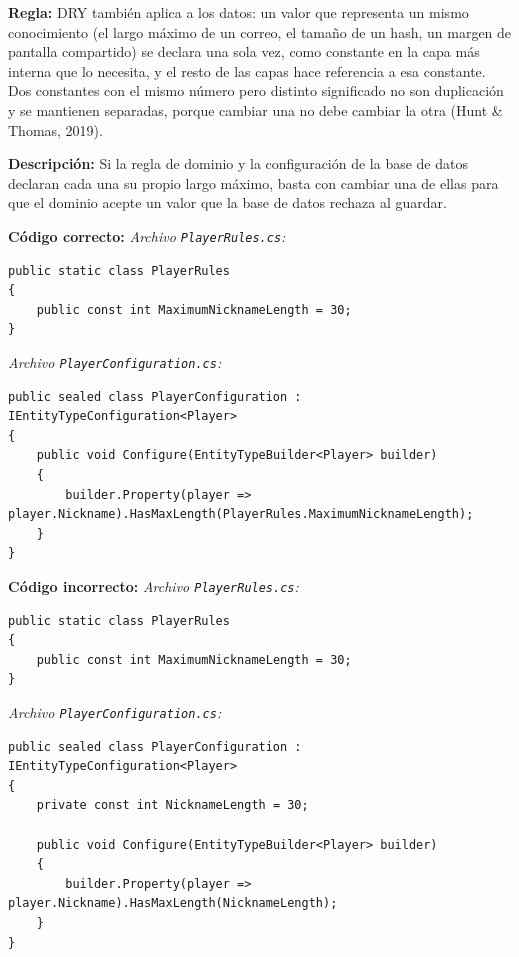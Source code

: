 \textbf{Regla:} DRY también aplica a los datos: un valor que representa un mismo conocimiento (el largo máximo de un correo, el tamaño de un hash, un margen de pantalla compartido) se declara una sola vez, como constante en la capa más interna que lo necesita, y el resto de las capas hace referencia a esa constante. Dos constantes con el mismo número pero distinto significado no son duplicación y se mantienen separadas, porque cambiar una no debe cambiar la otra (Hunt \& Thomas, 2019).

\textbf{Descripción:} Si la regla de dominio y la configuración de la base de datos declaran cada una su propio largo máximo, basta con cambiar una de ellas para que el dominio acepte un valor que la base de datos rechaza al guardar.

\textbf{Código correcto:}
\textit{Archivo \texttt{PlayerRules.cs}:}
\begin{lstlisting}[style=csharpstyle]
public static class PlayerRules
{
    public const int MaximumNicknameLength = 30;
}
\end{lstlisting}

\textit{Archivo \texttt{PlayerConfiguration.cs}:}
\begin{lstlisting}[style=csharpstyle]
public sealed class PlayerConfiguration : IEntityTypeConfiguration<Player>
{
    public void Configure(EntityTypeBuilder<Player> builder)
    {
        builder.Property(player => player.Nickname).HasMaxLength(PlayerRules.MaximumNicknameLength);
    }
}
\end{lstlisting}

\textbf{Código incorrecto:}
\textit{Archivo \texttt{PlayerRules.cs}:}
\begin{lstlisting}[style=csharpstyle]
public static class PlayerRules
{
    public const int MaximumNicknameLength = 30;
}
\end{lstlisting}

\textit{Archivo \texttt{PlayerConfiguration.cs}:}
\begin{lstlisting}[style=csharpstyle]
public sealed class PlayerConfiguration : IEntityTypeConfiguration<Player>
{
    private const int NicknameLength = 30;

    public void Configure(EntityTypeBuilder<Player> builder)
    {
        builder.Property(player => player.Nickname).HasMaxLength(NicknameLength);
    }
}
\end{lstlisting}
